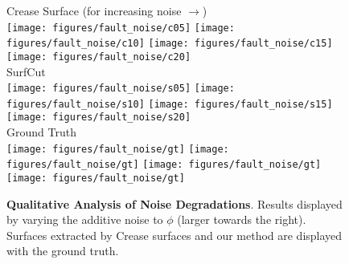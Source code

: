\documentclass[10pt,journal,compsoc]{IEEEtran}
\begin{document}
\def\fHeightFaultNoise{0.45in}
\begin{figure}
  \centering
  \footnotesize
  {Crease Surface (for increasing noise $\rightarrow$) \\
    \texttt{[image: figures/fault\_noise/c05]} 
    \texttt{[image: figures/fault\_noise/c10]} 
    \texttt{[image: figures/fault\_noise/c15]} 
    \texttt{[image: figures/fault\_noise/c20]} \\
    SurfCut \\
    \texttt{[image: figures/fault\_noise/s05]}
    \texttt{[image: figures/fault\_noise/s10]}
    \texttt{[image: figures/fault\_noise/s15]}
    \texttt{[image: figures/fault\_noise/s20]} \\
    Ground Truth \\
    \texttt{[image: figures/fault\_noise/gt]} 
    \texttt{[image: figures/fault\_noise/gt]} 
    \texttt{[image: figures/fault\_noise/gt]} 
    \texttt{[image: figures/fault\_noise/gt]} \\
  }
  \caption{{\bf Qualitative Analysis of Noise Degradations}. Results
    displayed by varying the additive noise to $\phi$ (larger towards
    the right). Surfaces extracted by Crease
    surfaces and our method are displayed with the ground truth.}
  \label{fig:noise_expt_vis}
\end{figure}
\end{document}
